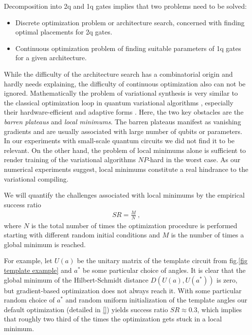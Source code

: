 \documentclass[draft, amsfonts, amssymb, aps, nofootinbib, twocolumn]{revtex4-2}
\begin{document}
Decomposition into 2q and 1q gates implies that two problems need to be solved:
\begin{itemize}
	\item Discrete optimization problem or architecture search, concerned with finding optimal placements for 2q gates.
	\item Continuous optimization problem of finding suitable parameters of 1q gates for a given architecture.
\end{itemize}
While the difficulty of the architecture search has a combinatorial origin and hardly needs explaining, the difficulty of continuous optimization also can not be ignored. Mathematically the problem of variational synthesis is very similar to the classical optimization loop in quantum variational algorithms \cite{}, especially their hardware-efficient \cite{Kandala2017} and adaptive \cite{} forms . Here, the two key obstacles are the \textit{barren plateaus} and \textit{local minimums}. The barren plateaus manifest as vanishing gradients and are usually associated with large number of qubits or parameters. In our experiments with small-scale quantum circuits we did not find it to be relevant. On the other hand, the problem of local minimums alone is sufficient to render training of the variational algorithms $NP$-hard \cite{Bittel2021} in the worst case. As our numerical experiments suggest, local minimums constitute a real hindrance to the variational compiling.

We will quantify the challenges associated with local minimums by the empirical success ratio
\begin{align}
	SR=\frac{M}{N} \ ,
\end{align}
where $N$ is the total number of times the optimization procedure is performed starting with different random initial conditions and $M$ is the number of times a global minimum is reached. 

For example, let $U(a)$ be the unitary matrix of the template circuit from fig.\ref{fig template example} and $a^*$ be some particular choice of angles. It is clear that the global minimum of the Hilbert-Schmidt distance $D(U(a), U(a^*))$ is zero, but gradient-based optimization does not always reach it. With some particular random choice of $a^*$ and random uniform initialization of the template angles our default optimization (detailed in \ref{}) yields success ratio $SR\approx0.3$, which implies that roughly two third of the times the optimization gets stuck in a local minimum. 
\end{document}
